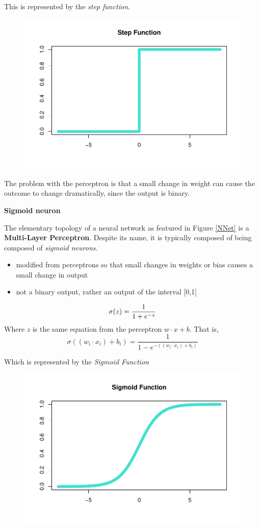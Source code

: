 This is represented by the \emph{step function}.

\begin{figure}[H]
    \centering
    \includegraphics[width = .7\textwidth]{Figures/step-function-1.pdf}
    \vspace{-40pt}
\end{figure}

The problem with the perceptron is that a small change in weight can
cause the outcome to change dramatically, since the output is binary.

\textbf{Sigmoid neuron}

The elementary topology of a neural network as featured in Figure \ref{NNet} is a \textbf{Multi-Layer Perceptron}.  Despite its name, it is typically composed of being composed of \textit{sigmoid neurons}.

\begin{itemize}
\tightlist
\item
  modified from perceptrons so that small changes in weights or bias
  causes a small change in output
\item
  not a binary output, rather an output of the interval {[}0,1{]}
\end{itemize}


\[
\sigma(z) = \frac{1}{1+e^{-z}} \\
\] Where \(z\) is the same equation from the perceptron
\(w \cdot x + b\). That is, 
$$
\sigma((w_i \cdot x_i) + b_i) = \frac{1}{1-e^{-((w_i \cdot x_i) + b_i)}}
$$

Which is represented by the \emph{Sigmoid Function}

\begin{figure}[H]
    \centering
    \includegraphics[width = .7\textwidth]{Figures/sigmoid-function-1.pdf}
   \vspace{-40pt}
\end{figure}

